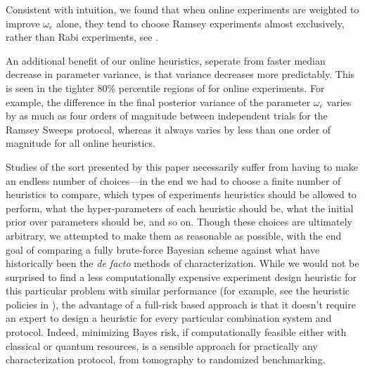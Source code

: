 \documentclass[aps,nofootinbib,twocolumn,superscriptaddress]{revtex4}
\begin{document}
Consistent with intuition, we found that when online experiments are weighted
to improve $\omega_e$ alone, they tend to choose Ramsey experiments almost
exclusively, rather than Rabi experiments, see
.

An additional benefit of our online heuristics, seperate from faster
median decrease in parameter variance, is that variance decreases more
predictably.
This is seen in the tighter 80\% percentile regions of
 for online experiments.
For example, the difference in the final posterior variance of the parameter
$\omega_e$ varies by as much as four orders of magnitude between
independent trials for the Ramsey Sweeps protocol, whereas it
always varies by less than one order of magnitude for all online heuristics.

Studies of the sort presented by this paper necessarily suffer from having to
make an endless number of choices---in the end we had to choose a
finite number of heuristics to compare, which types of experiments heuristics
should be allowed to perform, what the hyper-parameters of each heuristic
should be, what the initial prior over parameters should be, and so on. Though these choices are ultimately arbitrary, we attempted to make them
as reasonable as possible, with the end goal of comparing a fully brute-force
Bayesian scheme against what have historically been the \emph{de facto}
methods of characterization.
While we would not be surprised to find a less computationally expensive
experiment design heuristic for this particular problem
with similar performance (for example, see
the heuristic policies in \cite{stenberg_characterization_2016}),
the advantage of a full-risk based approach is that it doesn't require an
expert to design a heuristic for every particular combination system and
protocol.
Indeed, minimizing Bayes risk, if computationally feasible either with
classical or quantum resources, is a sensible approach for practically
any characterization protocol, from tomography to randomized benchmarking.

\end{document}
